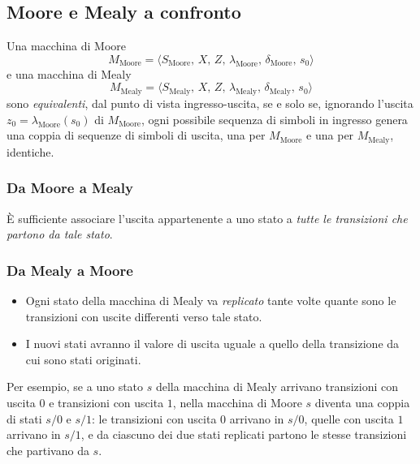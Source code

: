 \documentclass[11pt,a4paper]{article}
\begin{document}
\subsection{Moore e Mealy a confronto}

Una macchina di Moore
\[
M_{\text{Moore}} = \langle S_{\text{Moore}},\, X,\, Z,\, \lambda_{\text{Moore}},\, \delta_{\text{Moore}},\, s_0\rangle
\]
e una macchina di Mealy
\[
M_{\text{Mealy}} = \langle S_{\text{Mealy}},\, X,\, Z,\, \lambda_{\text{Mealy}},\, \delta_{\text{Mealy}},\, s_0\rangle
\]
sono \emph{equivalenti}, dal punto di vista ingresso-uscita, se e solo se, ignorando l'uscita $z_0 = \lambda_{\text{Moore}}(s_0)$ di $M_{\text{Moore}}$, ogni possibile sequenza di simboli in ingresso genera una coppia di sequenze di simboli di uscita, una per $M_{\text{Moore}}$ e una per $M_{\text{Mealy}}$, identiche.

\subsubsection{Da Moore a Mealy}

È sufficiente associare l'uscita appartenente a uno stato a \emph{tutte le transizioni che partono da tale stato}.

\begin{center}
\end{center}

\subsubsection{Da Mealy a Moore}

\begin{itemize}
    \item Ogni stato della macchina di Mealy va \emph{replicato} tante volte quante sono le transizioni con uscite differenti verso tale stato.
    \item I nuovi stati avranno il valore di uscita uguale a quello della transizione da cui sono stati originati.
\end{itemize}
Per esempio, se a uno stato $s$ della macchina di Mealy arrivano transizioni con uscita $0$ e transizioni con uscita $1$, nella macchina di Moore $s$ diventa una coppia di stati $s/0$ e $s/1$: le transizioni con uscita $0$ arrivano in $s/0$, quelle con uscita $1$ arrivano in $s/1$, e da ciascuno dei due stati replicati partono le stesse transizioni che partivano da $s$.
\end{document}
